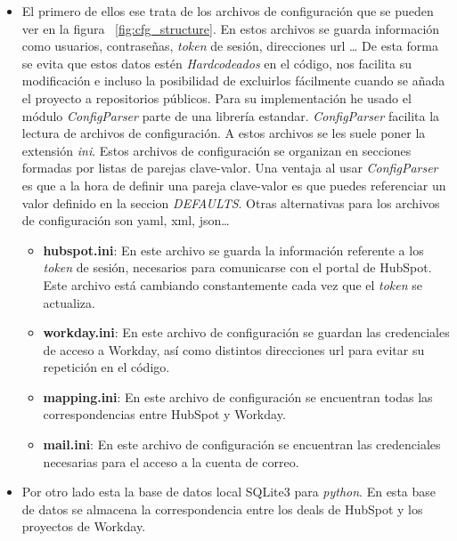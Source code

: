 \begin{itemize}[leftmargin=*]
\item El primero de ellos ese trata de los archivos de configuración que se pueden ver en la figura ~\ref{fig:cfg_structure}.
En estos archivos se guarda información como usuarios, contraseñas, \textit{token} de sesión, direcciones url \ldots
De esta forma se evita que estos datos estén \textit{Hardcodeados} en el código, nos facilita su modificación e
incluso la posibilidad de excluirlos fácilmente cuando se añada el proyecto a repositorios públicos.
Para su implementación he usado el módulo \textit{ConfigParser} \cite{ConfigParser} parte de una librería estandar. \textit{ConfigParser} facilita la lectura de archivos de configuración. A estos archivos se les suele poner la extensión \textit{ini}.
Estos archivos de configuración se organizan en secciones formadas por listas de parejas clave-valor.
Una ventaja al usar \textit{ConfigParser} es que a la hora de definir una pareja clave-valor es que puedes referenciar un valor definido en la seccion \textit{DEFAULTS}.
Otras alternativas para los archivos de configuración son yaml, xml, json\ldots



\begin{itemize}
	\item [\textendash] \textbf{hubspot.ini}: En este archivo se guarda la información referente a los \textit{token} de sesión, necesarios para comunicarse con el portal de HubSpot. 
	Este archivo está cambiando constantemente cada vez que el \textit{token} se actualiza.
	\item [\textendash] \textbf{workday.ini}: En este archivo de configuración se 
	guardan las credenciales de acceso a Workday, así como distintos direcciones url para evitar su repetición en el código.
	\item [\textendash] \textbf{mapping.ini}: En este archivo de configuración se encuentran todas las correspondencias entre HubSpot y Workday.
	\item [\textendash] \textbf{mail.ini}: En este archivo de configuración se encuentran las credenciales necesarias para el acceso a la cuenta de correo.
\end{itemize}




\item Por otro lado esta la base de datos local SQLite3 \cite{sqlite3} para \textit{python}.
 En esta base de datos se almacena la correspondencia entre los deals de HubSpot y los proyectos de Workday.
 

\end{itemize}
